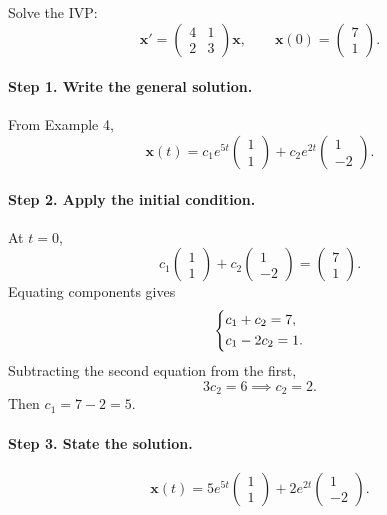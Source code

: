 \documentclass[10pt,letterpaper]{article}
\begin{document}
\begin{example}[5]{
Solve the IVP:
\[
\mathbf{x}'=
\begin{pmatrix}
4&1\\
2&3
\end{pmatrix}\mathbf{x},
\qquad
\mathbf{x}(0)=\begin{pmatrix}7\\1\end{pmatrix}.
\]
}

\paragraph{Step 1. Write the general solution.}
From Example 4,
\[
\mathbf{x}(t)
=c_1e^{5t}\begin{pmatrix}1\\1\end{pmatrix}
+c_2e^{2t}\begin{pmatrix}1\\-2\end{pmatrix}.
\]

\paragraph{Step 2. Apply the initial condition.}
At $t=0$,
\[
c_1\begin{pmatrix}1\\1\end{pmatrix}
+c_2\begin{pmatrix}1\\-2\end{pmatrix}
=\begin{pmatrix}7\\1\end{pmatrix}.
\]
Equating components gives
\[
\begin{dcases}
c_1+c_2=7,\\
c_1-2c_2=1.
\end{dcases}
\]
Subtracting the second equation from the first,
\[
3c_2=6
\implies c_2=2.
\]
Then $c_1=7-2=5$.

\paragraph{Step 3. State the solution.}
\[
\boxed{
\mathbf{x}(t)
=5e^{5t}\begin{pmatrix}1\\1\end{pmatrix}
+2e^{2t}\begin{pmatrix}1\\-2\end{pmatrix}.
}
\]
\end{example}
\end{document}
